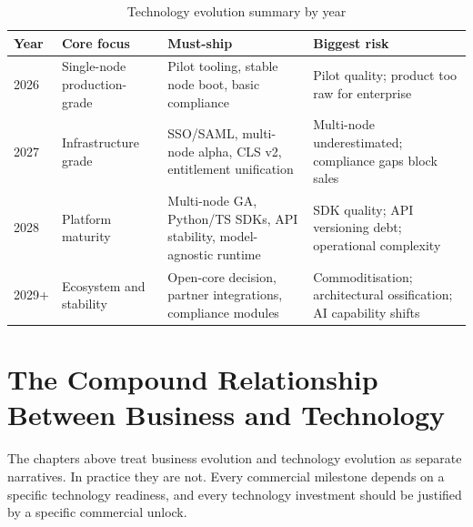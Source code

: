 \begin{table}[H]
\centering
\renewcommand{\arraystretch}{1.5}
\begin{tabularx}{\textwidth}{@{}lXXX@{}}
\toprule
\textbf{Year} & \textbf{Core focus} & \textbf{Must-ship} & \textbf{Biggest risk} \\
\midrule
2026 & Single-node production-grade & Pilot tooling, stable node boot, basic compliance & Pilot quality; product too raw for enterprise \\
2027 & Infrastructure grade & SSO/SAML, multi-node alpha, CLS v2, entitlement unification & Multi-node underestimated; compliance gaps block sales \\
2028 & Platform maturity & Multi-node GA, Python/TS SDKs, API stability, model-agnostic runtime & SDK quality; API versioning debt; operational complexity \\
2029+ & Ecosystem and stability & Open-core decision, partner integrations, compliance modules & Commoditisation; architectural ossification; AI capability shifts \\
\bottomrule
\end{tabularx}
\caption{Technology evolution summary by year}
\end{table}

\section{The Compound Relationship Between Business and Technology}

The chapters above treat business evolution and technology evolution as separate
narratives. In practice they are not. Every commercial milestone depends on a
specific technology readiness, and every technology investment should be
justified by a specific commercial unlock.

